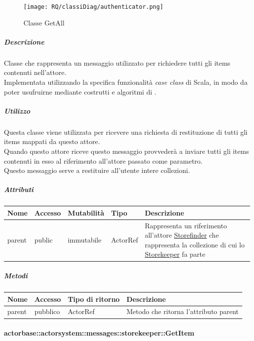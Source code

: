 \documentclass{scalatekids-article}
\begin{document}
\begin{figure}[H]
  \begin{center}
    \texttt{[image: RQ/classiDiag/authenticator.png]}
    \caption{Classe GetAll}
  \end{center}
\end{figure}

\subparagraph{Descrizione}
Classe che rappresenta un messaggio utilizzato per richiedere tutti gli items
contenuti nell'attore.\\Implementata utilizzando la specifica funzionalità \textit{case class} di Scala,
in modo da poter usufruirne mediante costrutti e algoritmi di
.

\subparagraph{Utilizzo}
Questa classe viene utilizzata per ricevere una richiesta di restituzione di
tutti gli items mappati da questo attore.\\Quando questo attore riceve questo
messaggio provvederà a inviare tutti gli items contenuti in esso al riferimento
all'attore passato come parametro.\\Questo messaggio serve a
restituire all'utente intere collezioni.

\subparagraph{Attributi}
\begin{tabular}{| p{2cm} | p{1.5cm} | p{2cm} | p{3cm} | p{8.5cm} |}
  \hline
  Nome & Accesso & Mutabilità & Tipo & Descrizione\\
  \hline
  parent & public & immutabile & ActorRef & Rappresenta un riferimento all'attore \hyperref[sec:actorbase::actorsystem::actors::storefinder::Storefinder]{Storefinder} che rappresenta la collezione di cui lo \hyperref[sec:actorbase::actorsystem::actors::storekeeper::Storekeeper]{Storekeeper} fa parte\\
  \hline
\end{tabular}

\subparagraph{Metodi}
\begin{tabular}{| l | l | l | l |}
  \hline
  Nome & Accesso & Tipo di ritorno & Descrizione\\
  \hline
  parent & pubblico & ActorRef & Metodo che ritorna l'attributo parent\\
  \hline
\end{tabular}

\paragraph{actorbase::actorsystem::messages::storekeeper::GetItem}
\label{sec:actorbase::actorsystem::messages::storekeeper::GetItem}
\end{document}
